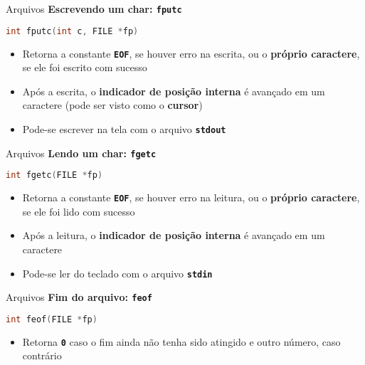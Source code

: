 \documentclass[10pt]{beamer}
\begin{document}
\begin{frame}[fragile]{Arquivos}
  \huge
  \textbf{Escrevendo um char: \texttt{fputc}}
  \vfill
  \large
  \begin{lstlisting}[language=C]
int fputc(int c, FILE *fp)
  \end{lstlisting}
  \vfill
  \setlength{\leftmargini}{0pt}
  \begin{itemize}
      \item [] Retorna a constante \textbf{\texttt{EOF}}, se houver erro na escrita, ou o \textbf{próprio caractere}, se ele foi escrito com sucesso
      \item [] Após a escrita, o \textbf{indicador de posição interna} é avançado em um caractere (pode ser visto como o \textbf{cursor})
      \item [] Pode-se escrever na tela com o arquivo \textbf{\texttt{stdout}}
  \end{itemize}
\end{frame}

\begin{frame}[fragile]{Arquivos}
  \huge
  \textbf{Lendo um char: \texttt{fgetc}}
  \vfill
  \large
  \begin{lstlisting}[language=C]
int fgetc(FILE *fp)
  \end{lstlisting}
  \vfill
  \setlength{\leftmargini}{0pt}
  \begin{itemize}
    \item [] Retorna a constante \textbf{\texttt{EOF}}, se houver erro na leitura, ou o \textbf{próprio caractere}, se ele foi lido com sucesso
    \item [] Após a leitura, o \textbf{indicador de posição interna} é avançado em um caractere
      \item [] Pode-se ler do teclado com o arquivo \textbf{\texttt{stdin}}
    \end{itemize}
\end{frame}

\begin{frame}[fragile]{Arquivos}
  \huge
  \textbf{Fim do arquivo: \texttt{feof}}
  \vfill
  \large
  \begin{lstlisting}[language=C]
int feof(FILE *fp)
  \end{lstlisting}
  \vfill
  \setlength{\leftmargini}{0pt}
  \begin{itemize}
      \item [] Retorna \texttt{\textbf{0}} caso o fim ainda não tenha sido atingido e outro número, caso contrário
  \end{itemize}
\end{frame}
\end{document}
